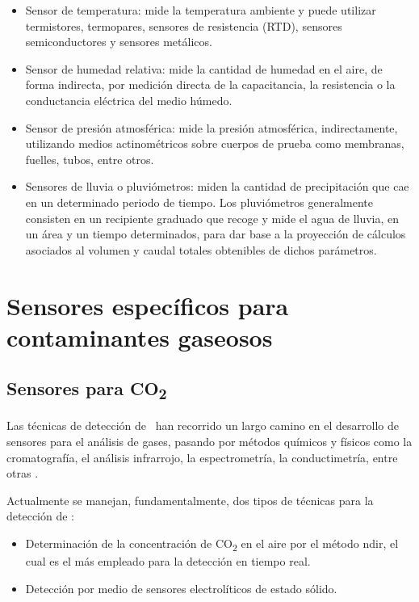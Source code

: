 \begin{itemize}
  \item Sensor de temperatura: mide la temperatura ambiente y puede utilizar termistores, termopares, sensores de resistencia (RTD), sensores semiconductores y sensores metálicos.
  \item Sensor de humedad relativa: mide la cantidad de humedad en el aire, de forma indirecta, por medición directa de la capacitancia, la resistencia o la conductancia eléctrica del medio húmedo.
  \item Sensor de presión atmosférica: mide la presión atmosférica, indirectamente, utilizando medios actinométricos sobre cuerpos de prueba como membranas, fuelles, tubos, entre otros.
  \item Sensores de lluvia o pluviómetros: miden la cantidad de precipitación que cae en un determinado periodo de tiempo. Los pluviómetros generalmente consisten en un recipiente graduado que recoge y mide el agua de lluvia, en un área y un tiempo determinados, para dar base a la proyección de cálculos asociados al volumen y caudal totales obtenibles de dichos parámetros.
\end{itemize}

\section[Sensores específicos para contaminantes gaseosos]{Sensores específicos para\\ contaminantes gaseosos}

\subsection{Sensores para CO\textsubscript{2}}

Las técnicas de detección de \CO\ han recorrido un largo camino en el desarrollo de sensores para el análisis de gases, pasando por métodos químicos y físicos como la cromatografía, el análisis infrarrojo, la espectrometría, la conductimetría, entre otras \cite{Kumar-2007}.

Actualmente se manejan, fundamentalmente, dos tipos de técnicas para la detección de \CO:
\begin{itemize}
  \item Determinación de la concentración de CO\textsubscript{2} en el aire por el método \gls{ndir}, el cual es el más empleado para la detección en tiempo real.
  \item Detección por medio de sensores electrolíticos de estado sólido.
\end{itemize}

